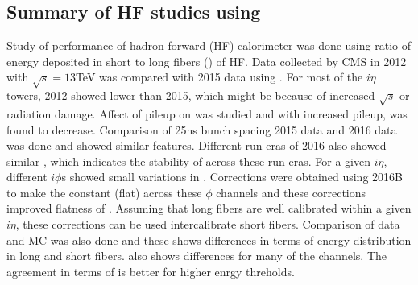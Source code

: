 \subsection{Summary of HF studies using \ratiosl}
Study of performance of hadron forward (HF) calorimeter was done using ratio of energy deposited in short to long fibers (\ratiosl) of HF. Data collected by CMS in 2012 with $\sqrt{s}=13$TeV was compared with 2015 data using \ratiosl. For most of the $i\eta$ towers, 2012 showed lower \ratiosl than 2015, which might be because of increased $\sqrt{s}$ or radiation damage. Affect of pileup on \ratiosl was studied and with increased pileup, \ratiosl was found to decrease. Comparison of 25ns bunch spacing 2015 data and 2016 data was done and \ratiosl showed similar features. Different run eras of 2016 also showed similar \ratiosl, which indicates the stability of \ratiosl across these run eras. For a given $i\eta$, different $i\phi$s showed small variations in \ratiosl. Corrections were obtained using 2016B to make the \ratiosl constant (flat) across these $\phi$ channels and these corrections improved flatness of \ratiosl. Assuming that long fibers are well calibrated within a given $i\eta$, these corrections can be used intercalibrate short fibers. Comparison of data and MC was also done and these shows differences in terms of energy distribution in long and short fibers. \ratiosl also shows differences for many of the channels. The agreement in terms of \ratiosl is better for higher enrgy threholds.






